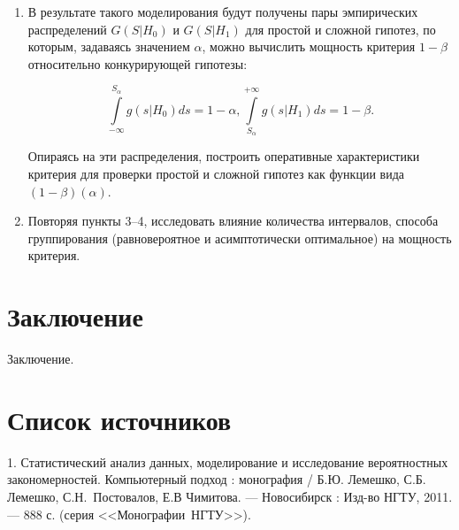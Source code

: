 \documentclass[a4paper,14pt]{extarticle}
\begin{document}
\begin{enumerate}
	\item В результате такого моделирования будут получены пары эмпирических
		распределений $G(S|H_0)$ и $G(S|H_1)$ для простой и сложной гипотез, по
		которым, задаваясь значением $\alpha$, можно вычислить мощность критерия
		$1-\beta$ относительно конкурирующей гипотезы:

	\begin{equation}
		\int\limits_{-\infty}^{S_\alpha} g(s|H_0) ds = 1 - \alpha, 
		\int\limits_{S_\alpha}^{+\infty} g(s|H_1) ds = 1 - \beta.
	\end{equation}

	Опираясь на эти распределения, построить оперативные характеристики
	критерия для проверки простой и сложной гипотез как функции вида
	$(1-\beta)(\alpha)$.

	\item Повторяя пункты 3--4, исследовать влияние количества интервалов,
		способа группирования (равновероятное и асимптотически оптимальное) на
		мощность критерия.

\end{enumerate}

\section*{Заключение}

Заключение.

\section*{Список источников}

1. Статистический анализ данных, моделирование и исследование вероятностных
закономерностей. Компьютерный подход : монография / Б.Ю. Лемешко, С.Б. Лемешко,
\mbox{С.Н. Постовалов}, Е.В Чимитова. --- Новосибирск : Изд-во НГТУ, 2011. ---
888 с.
(серия <<\mbox{Монографии НГТУ}>>).
\end{document}
